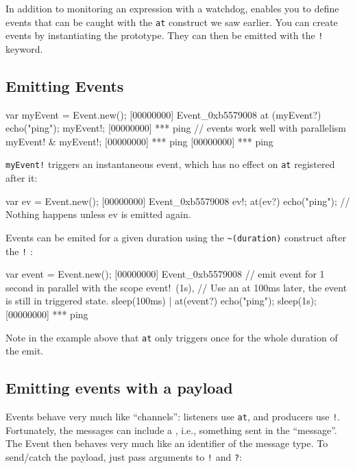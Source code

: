 In addition to monitoring an expression with a watchdog, \us enables you to
define events that can be caught with the \lstinline|at| construct we saw earlier. You can create events by
instantiating the  prototype. They can then be emitted with
the \lstinline|!| keyword.

\subsection{Emitting Events}

\begin{urbiscript}[firstnumber=1]
var myEvent = Event.new();
[00000000] Event_0xb5579008
at (myEvent?)
  echo("ping");
myEvent!;
[00000000] *** ping
// events work well with parallelism
myEvent! & myEvent!;
[00000000] *** ping
[00000000] *** ping
\end{urbiscript}

\lstinline|myEvent!| triggers an instantaneous event, which has no effect on
\lstinline|at| registered after it:

\begin{urbiscript}[firstnumber=1]
var ev = Event.new();
[00000000] Event_0xb5579008
ev!;
at(ev?) echo("ping");
// Nothing happens unless ev is emitted again.
\end{urbiscript}

Events can be emited for a given duration using the \lstinline|~(duration)|
construct after the \lstinline|!| :

\begin{urbiscript}[firstnumber=1]
var event = Event.new();
[00000000] Event_0xb5579008
// emit event for 1 second in parallel with the scope
event!~(1s),
// Use an at 100ms later, the event is still in triggered state.
sleep(100ms) | at(event?) echo("ping");
sleep(1s);
[00000000] *** ping
\end{urbiscript}

Note in the example above that \lstinline|at| only triggers once for the whole
duration of the emit.

\subsection{Emitting events with a payload}
\label{sec:tut:events:payload}

Events behave very much like ``channels'': listeners use \lstinline|at|,
and producers use \lstinline|!|.  Fortunately, the
messages can include a , i.e., something sent in the
``message''.  The Event then behaves very much like an identifier of the
message type.  To send/catch the payload, just pass arguments to
\lstinline|!| and \lstinline|?|:

